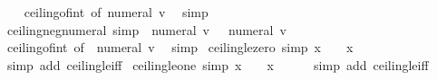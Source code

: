 \begin{isabellebody}
%
\isadelimproof
\ \ %
\endisadelimproof
%
\isatagproof
{}\isamarkupfalse%
\ ceiling{\isacharunderscore}{\kern0pt}of{\isacharunderscore}{\kern0pt}int\ {\isacharbrackleft}{\kern0pt}of\ {\isachardoublequoteopen}numeral\ v{\isachardoublequoteclose}{\isacharbrackright}{\kern0pt}\ \isamarkupfalse%
\ simp%
\endisatagproof
{\isafoldproof}%
%
\isadelimproof
\isanewline
%
\endisadelimproof
\isanewline
{}\isamarkupfalse%
\ ceiling{\isacharunderscore}{\kern0pt}neg{\isacharunderscore}{\kern0pt}numeral\ {\isacharbrackleft}{\kern0pt}simp{\isacharbrackright}{\kern0pt}{\isacharcolon}{\kern0pt}\ {\isachardoublequoteopen}{\isasymlceil}{\isacharminus}{\kern0pt}\ numeral\ v{\isasymrceil}\ {\isacharequal}{\kern0pt}\ {\isacharminus}{\kern0pt}\ numeral\ v{\isachardoublequoteclose}\isanewline
%
\isadelimproof
\ \ %
\endisadelimproof
%
\isatagproof
{}\isamarkupfalse%
\ ceiling{\isacharunderscore}{\kern0pt}of{\isacharunderscore}{\kern0pt}int\ {\isacharbrackleft}{\kern0pt}of\ {\isachardoublequoteopen}{\isacharminus}{\kern0pt}\ numeral\ v{\isachardoublequoteclose}{\isacharbrackright}{\kern0pt}\ \isamarkupfalse%
\ simp%
\endisatagproof
{\isafoldproof}%
%
\isadelimproof
\isanewline
%
\endisadelimproof
\isanewline
{}\isamarkupfalse%
\ ceiling{\isacharunderscore}{\kern0pt}le{\isacharunderscore}{\kern0pt}zero\ {\isacharbrackleft}{\kern0pt}simp{\isacharbrackright}{\kern0pt}{\isacharcolon}{\kern0pt}\ {\isachardoublequoteopen}{\isasymlceil}x{\isasymrceil}\ {\isasymle}\ {}\ {\isasymlongleftrightarrow}\ x\ {\isasymle}\ {}{\isachardoublequoteclose}\isanewline
%
\isadelimproof
\ \ %
\endisadelimproof
%
\isatagproof
{}\isamarkupfalse%
\ {\isacharparenleft}{\kern0pt}simp\ add{\isacharcolon}{\kern0pt}\ ceiling{\isacharunderscore}{\kern0pt}le{\isacharunderscore}{\kern0pt}iff{\isacharparenright}{\kern0pt}%
\endisatagproof
{\isafoldproof}%
%
\isadelimproof
\isanewline
%
\endisadelimproof
\isanewline
{}\isamarkupfalse%
\ ceiling{\isacharunderscore}{\kern0pt}le{\isacharunderscore}{\kern0pt}one\ {\isacharbrackleft}{\kern0pt}simp{\isacharbrackright}{\kern0pt}{\isacharcolon}{\kern0pt}\ {\isachardoublequoteopen}{\isasymlceil}x{\isasymrceil}\ {\isasymle}\ {}\ {\isasymlongleftrightarrow}\ x\ {\isasymle}\ {}{\isachardoublequoteclose}\isanewline
%
\isadelimproof
\ \ %
\endisadelimproof
%
\isatagproof
{}\isamarkupfalse%
\ {\isacharparenleft}{\kern0pt}simp\ add{\isacharcolon}{\kern0pt}\ ceiling{\isacharunderscore}{\kern0pt}le{\isacharunderscore}{\kern0pt}iff{\isacharparenright}{\kern0pt}%

\end{isabellebody}
